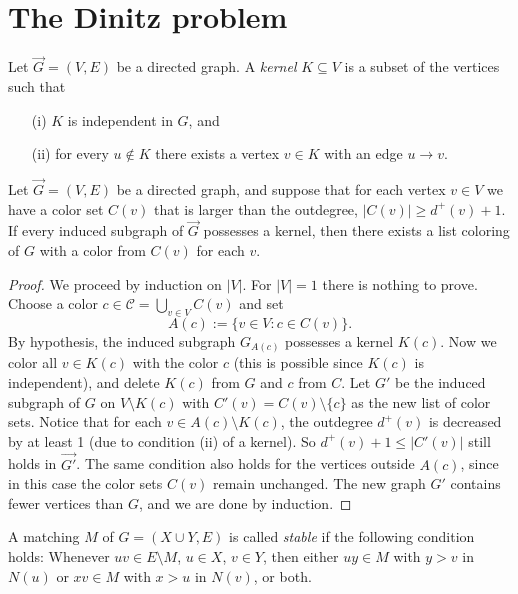 \chapter{The Dinitz problem}

\begin{definition}
  \label{ch38definition1}
  Let $\vec{G} = (V, E)$ be a directed graph. A \textit{kernel} $K \subseteq V$ is a subset of the vertices such that
\begin{itemize}
    \item[(i)] $K$ is independent in $G$, and
    \item[(ii)] for every $u \notin K$ there exists a vertex $v \in K$ with an edge $u \rightarrow v$.
\end{itemize}
\end{definition}

\begin{lemma}
  \label{ch38lemma1}
  Let $\vec{G} = (V, E)$ be a directed graph, and suppose that for each vertex $v \in V$ we have
  a color set $C(v)$ that is larger than the outdegree, $|C(v)| \geq d^+(v) + 1$.
  If every induced subgraph of $\vec{G}$ possesses a kernel, then there exists a list coloring
  of $G$ with a color from $C(v)$ for each $v$.
\end{lemma}
\begin{proof}
We proceed by induction on $|V|$. For $|V| = 1$ there is nothing to prove. Choose a color
$c \in \mathcal{C} = \bigcup_{v \in V} C(v)$ and set
\[
A(c) := \{v \in V : c \in C(v)\}.
\]
By hypothesis, the induced subgraph $G_{A(c)}$ possesses a kernel $K(c)$. Now we color all
$v \in K(c)$ with the color $c$ (this is possible since $K(c)$ is independent),
and delete $K(c)$ from $G$ and $c$ from $C$. Let $G'$ be the induced subgraph of $G$ on
$V \setminus K(c)$ with $C'(v) = C(v) \setminus \{c\}$ as the new list of color sets.
Notice that for each $v \in A(c) \setminus K(c)$, the outdegree $d^+(v)$ is decreased by at
least 1 (due to condition (ii) of a kernel). So $d^+(v) + 1 \leq |C'(v)|$ still holds in $\vec{G'}$.
The same condition also holds for the vertices outside $A(c)$, since in this case the color
sets $C(v)$ remain unchanged. The new graph $G'$ contains fewer vertices than $G$, and we are done
by induction.
\end{proof}


\begin{definition}
  \label{ch38definition2}
A matching $M$ of $G = (X \cup Y, E)$ is called \textit{stable} if the following condition holds:
Whenever $uv \in E \setminus M$, $u \in X$, $v \in Y$, then either $uy \in M$ with
$y > v$ in $N(u)$ or $xv \in M$ with $x > u$ in $N(v)$, or both.
\end{definition}



